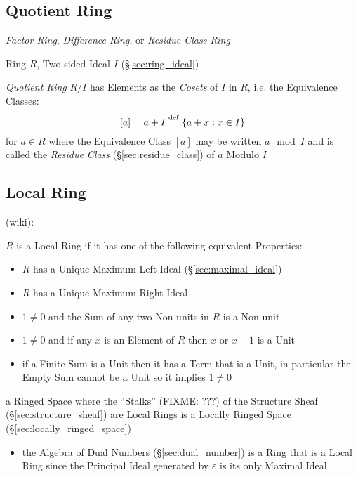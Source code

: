 \subsection{Quotient Ring}\label{sec:quotient_ring}

\emph{Factor Ring}, \emph{Difference Ring}, or \emph{Residue Class Ring}

Ring $R$, Two-sided Ideal $I$ (\S\ref{sec:ring_ideal})

\emph{Quotient Ring} $R / I$ has Elements as the \emph{Cosets} of $I$ in $R$,
i.e. the Equivalence Classes:
\[
  [a] = a + I \stackrel{\mathrm{def}}= \{ a + x : x \in I \}
\]
for $a \in R$ where the Equivalence Class $[a]$ may be written $a \mod I$ and is
called the \emph{Residue Class} (\S\ref{sec:residue_class}) of $a$ Modulo $I$



\subsection{Local Ring}\label{sec:local_ring}

(wiki):

$R$ is a Local Ring if it has one of the following equivalent Properties:
\begin{itemize}
  \item $R$ has a Unique Maximum Left Ideal (\S\ref{sec:maximal_ideal})
  \item $R$ has a Unique Maximum Right Ideal
  \item $1 \neq 0$ and the Sum of any two Non-units in $R$ is a Non-unit
  \item $1 \neq 0$ and if any $x$ is an Element of $R$ then $x$ or $x - 1$ is a
    Unit
  \item if a Finite Sum is a Unit then it has a Term that is a Unit, in
    particular the Empty Sum cannot be a Unit so it implies $1 \neq 0$
\end{itemize}

a Ringed Space where the ``Stalks'' (FIXME: ???) of the Structure Sheaf
(\S\ref{sec:structure_sheaf}) are Local Rings is a Locally Ringed Space
(\S\ref{sec:locally_ringed_space})

\begin{itemize}
  \item the Algebra of Dual Numbers (\S\ref{sec:dual_number}) is a Ring that is
    a Local Ring since the Principal Ideal generated by $\varepsilon$ is its
    only Maximal Ideal
\end{itemize}


